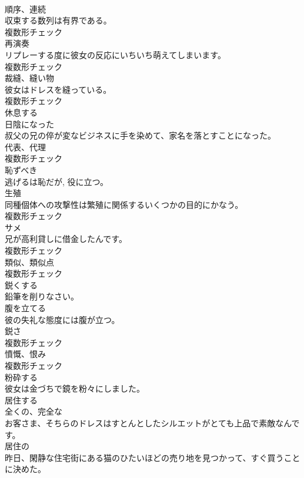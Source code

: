 \documentclass[8pt]{extreport}
\begin{document}
\begin{CJK}{UTF8}{min}
\\	[名詞]	順序、連続	
\\	収束する数列は有界である。	
\\	複数形チェック
\\	[名詞]	再演奏	
\\	リプレーする度に彼女の反応にいちいち萌えてしまいます。	
\\	複数形チェック
\\	[名詞]	裁縫、縫い物	
\\	彼女はドレスを縫っている。	
\\	複数形チェック
\\	[動詞]	休息する	
\\	[形容詞]	日陰になった	
\\	叔父の兄の倅が変なビジネスに手を染めて、家名を落とすことになった。	
\\	[名詞]	代表、代理	
\\	複数形チェック
\\	[形容詞]	恥ずべき	
\\	逃げるは恥だが, 役に立つ。	
\\	[名詞]	生殖	
\\	同種個体への攻撃性は繁殖に関係するいくつかの目的にかなう。	
\\	複数形チェック
\\	[名詞]	サメ	
\\	兄が高利貸しに借金したんです。	
\\	複数形チェック
\\	[名詞]	類似、類似点	
\\	複数形チェック
\\	[動詞]	鋭くする	
\\	鉛筆を削りなさい。	
\\	[動詞]	腹を立てる	
\\	彼の失礼な態度には腹が立つ。	
\\	[名詞]	鋭さ	
\\	複数形チェック
\\	[名詞]	憤慨、恨み	
\\	複数形チェック
\\	[動詞]	粉砕する	
\\	彼女は金づちで鏡を粉々にしました。	
\\	[動詞]	居住する	
\\	[形容詞]	全くの、完全な	
\\	お客さま、そちらのドレスはすとんとしたシルエットがとても上品で素敵なんです。	
\\	[形容詞]	居住の	
\\	昨日、閑静な住宅街にある猫のひたいほどの売り地を見つかって、すぐ買うことに決めた。	

\end{CJK}
\end{document}
